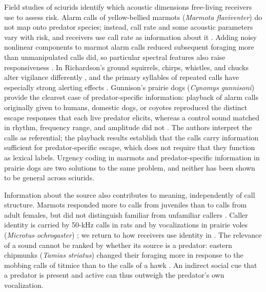 Field studies of sciurids identify which acoustic dimensions free-living receivers use to assess risk.
Alarm calls of yellow-bellied marmots (\textit{Marmota flaviventer}) do not map onto predator species; instead, call rate and some acoustic parameters vary with risk, and receivers use call rate as information about it \citep{BlumsteinArmitage1997}.
Adding noisy nonlinear components to marmot alarm calls reduced subsequent foraging more than unmanipulated calls did, so particular spectral features also raise responsiveness \citep{BlumsteinRecapet2009}.
In Richardson's ground squirrels, chirps, whistles, and chucks alter vigilance differently \citep{SloanEtAl2005}, and the primary syllables of repeated calls have especially strong alerting effects \citep{SwanHare2008}.
Gunnison's prairie dogs (\textit{Cynomys gunnisoni}) provide the clearest case of predator-specific information: playback of alarm calls originally given to humans, domestic dogs, or coyotes reproduced the distinct escape responses that each live predator elicits, whereas a control sound matched in rhythm, frequency range, and amplitude did not \citep{KiriazisSlobodchikoff2006}. The authors interpret the calls as referential; the playback results establish that the calls carry information sufficient for predator-specific escape, which does not require that they function as lexical labels. Urgency coding in marmots and predator-specific information in prairie dogs are two solutions to the same problem, and neither has been shown to be general across sciurids.

Information about the source also contributes to meaning, independently of call structure. Marmots responded more to calls from juveniles than to calls from adult females, but did not distinguish familiar from unfamiliar callers \citep{BlumsteinDaniel2004}.
Caller identity is carried by 50-kHz calls in rats \citep{VielleEtAl2021} and by vocalizations in prairie voles (\textit{Microtus ochrogaster}) \citep{WarrenEtAl2025}; we return to how receivers use identity in .
The relevance of a sound cannot be ranked by whether its source is a predator: eastern chipmunks (\textit{Tamias striatus}) changed their foraging more in response to the mobbing calls of titmice than to the calls of a hawk \citep{SchmidtEtAl2008}.
An indirect social cue that a predator is present and active can thus outweigh the predator's own vocalization.

